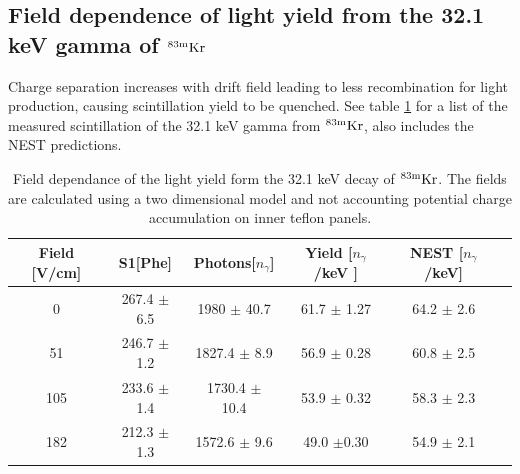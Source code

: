 \subsection{Field dependence of light yield from the 32.1 keV gamma of $\rm ^{83m}Kr$ }

Charge separation increases with drift field leading to less recombination for light production, causing scintillation yield to be quenched. See table \ref{table:kr32} for a list of the measured scintillation of the 32.1 keV gamma from $\rm ^{83m}Kr$, also includes the NEST predictions.

\begin{table}[h!]
\begin{center}
\begin{tabular}{|c|c|c|c|c|c|}
\hline
Field [V/cm]	&S1[Phe]	& Photons[$n_{\gamma}$]	& Yield [$n_{\gamma}$/keV	]	&NEST	   [$n_{\gamma}$/keV]\\ \hline
0 	&	267.4 $\pm$ 6.5 	&1980 $\pm$ 40.7 &	61.7 $\pm$	1.27 	&	64.2 $\pm$ 2.6  \\ \hline
51 &	246.7 $\pm$ 1.2 	&1827.4 $\pm$ 8.9 & 	56.9 $\pm$	0.28	 &	60.8 $\pm$ 2.5 \\ \hline
105 &	233.6 $\pm$ 1.4 	&1730.4 $\pm$ 	10.4 &	53.9 $\pm$ 0.32 	&	58.3 $\pm$ 2.3 \\ \hline
182 & 212.3 $\pm$ 1.3	&1572.6 $\pm$ 	9.6  &	49.0 $\pm$0.30 	&	54.9 $\pm$ 2.1 \\ \hline
\end{tabular}
\caption{Field dependance of the light yield form the 32.1 keV decay of $\rm^{83m}Kr$. The fields are calculated using a two dimensional model and not accounting potential charge accumulation on inner teflon panels.}
\label{table:kr32}
\end{center}
\end{table}



